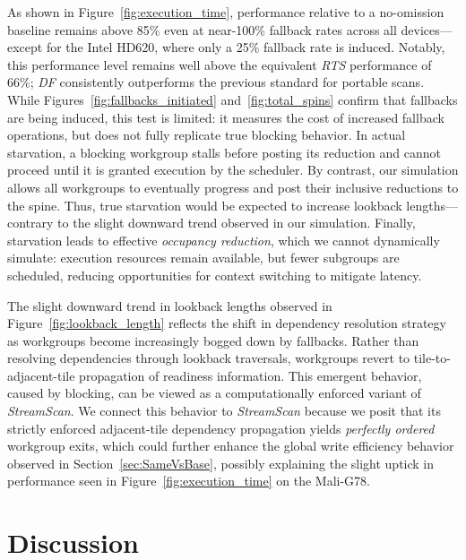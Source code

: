 \documentclass[sigconf,screen]{acmart}
\begin{document}
As shown in Figure~\ref{fig:execution_time}, performance relative to a no-omission baseline remains above 85\% even at near-100\% fallback rates across all devices—except for the Intel HD620, where only a 25\% fallback rate is induced. Notably, this performance level remains well above the equivalent \emph{RTS} performance of 66\%; \emph{DF} consistently outperforms the previous standard for portable scans. While Figures~\ref{fig:fallbacks_initiated} and~\ref{fig:total_spins} confirm that fallbacks are being induced, this test is limited: it measures the cost of increased fallback operations, but does not fully replicate true blocking behavior. In actual starvation, a blocking workgroup stalls before posting its reduction and cannot proceed until it is granted execution by the scheduler. By contrast, our simulation allows all workgroups to eventually progress and post their inclusive reductions to the spine. Thus, true starvation would be expected to increase lookback lengths—contrary to the slight downward trend observed in our simulation. Finally, starvation leads to effective \emph{occupancy reduction}, which we cannot dynamically simulate: execution resources remain available, but fewer subgroups are scheduled, reducing opportunities for context switching to mitigate latency.

The slight downward trend in lookback lengths observed in Figure~\ref{fig:lookback_length} reflects the shift in dependency resolution strategy as workgroups become increasingly bogged down by fallbacks. Rather than resolving dependencies through lookback traversals, workgroups revert to tile-to-adjacent-tile propagation of readiness information. This emergent behavior, caused by blocking, can be viewed as a computationally enforced variant of \emph{StreamScan}. We connect this behavior to \emph{StreamScan} because we posit that its strictly enforced adjacent-tile dependency propagation yields \emph{perfectly ordered} workgroup exits, which could further enhance the global write efficiency behavior observed in Section~\ref{sec:SameVsBase}, possibly explaining the slight uptick in performance seen in Figure~\ref{fig:execution_time} on the Mali-G78.

\section{Discussion}
\end{document}
